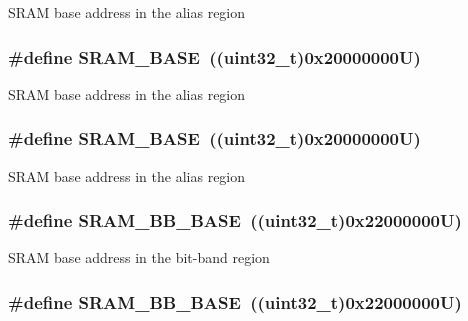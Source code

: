 S\-R\-A\-M base address in the alias region \hypertarget{group___peripheral__memory__map_ga05e8f3d2e5868754a7cd88614955aecc}{
\subsubsection[{S\-R\-A\-M\-\_\-\-B\-A\-S\-E}]{\setlength{\rightskip}{0pt plus 5cm}\#define S\-R\-A\-M\-\_\-\-B\-A\-S\-E~((uint32\-\_\-t)0x20000000\-U)}}\label{group___peripheral__memory__map_ga05e8f3d2e5868754a7cd88614955aecc}
S\-R\-A\-M base address in the alias region \hypertarget{group___peripheral__memory__map_ga05e8f3d2e5868754a7cd88614955aecc}{
\subsubsection[{S\-R\-A\-M\-\_\-\-B\-A\-S\-E}]{\setlength{\rightskip}{0pt plus 5cm}\#define S\-R\-A\-M\-\_\-\-B\-A\-S\-E~((uint32\-\_\-t)0x20000000\-U)}}\label{group___peripheral__memory__map_ga05e8f3d2e5868754a7cd88614955aecc}
S\-R\-A\-M base address in the alias region \hypertarget{group___peripheral__memory__map_gad3548b6e2f017f39d399358f3ac98454}{
\subsubsection[{S\-R\-A\-M\-\_\-\-B\-B\-\_\-\-B\-A\-S\-E}]{\setlength{\rightskip}{0pt plus 5cm}\#define S\-R\-A\-M\-\_\-\-B\-B\-\_\-\-B\-A\-S\-E~((uint32\-\_\-t)0x22000000\-U)}}\label{group___peripheral__memory__map_gad3548b6e2f017f39d399358f3ac98454}
S\-R\-A\-M base address in the bit-\/band region \hypertarget{group___peripheral__memory__map_gad3548b6e2f017f39d399358f3ac98454}{
\subsubsection[{S\-R\-A\-M\-\_\-\-B\-B\-\_\-\-B\-A\-S\-E}]{\setlength{\rightskip}{0pt plus 5cm}\#define S\-R\-A\-M\-\_\-\-B\-B\-\_\-\-B\-A\-S\-E~((uint32\-\_\-t)0x22000000\-U)}}\label{group___peripheral__memory__map_gad3548b6e2f017f39d399358f3ac98454}
